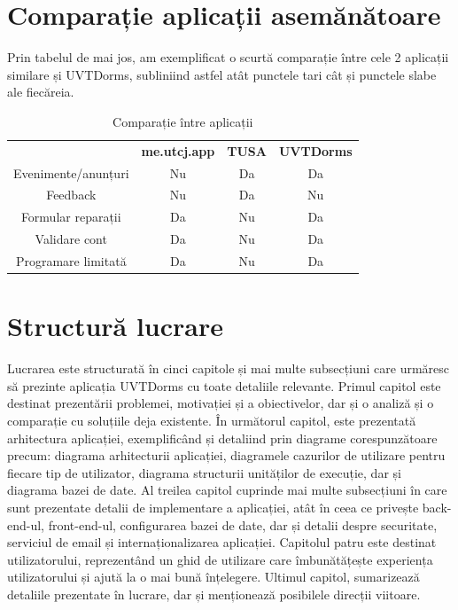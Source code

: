 \documentclass[12pt,a4paper]{report}
\theoremstyle{definition}
\theoremstyle{remark}
\begin{document}
\vspace{15mm}

\section{Comparație aplicații asemănătoare}
\par Prin tabelul de mai jos, am exemplificat o scurtă comparație între cele 2 aplicații similare și UVTDorms, subliniind astfel atât punctele tari cât și punctele slabe ale fiecăreia.

\begin{table}[H]
    \centering
    \begin{tabular}{cccc}
        & \textbf{me.utcj.app}         & \textbf{TUSA}  & \textbf{UVTDorms} \\
        Evenimente/anunțuri                            & Nu               & Da       &Da\\
        Feedback                                       & Nu               & Da       &Nu\\
        Formular reparații                             & Da               & Nu       &Da\\
        Validare cont                                  & Da               & Nu       &Da\\
        Programare limitată                            & Da               & Nu       &Da\\
    \end{tabular}
    \caption{Comparație între aplicații\label{comparatii-intre-aplicatii}}
\end{table}

\section{Structură lucrare}
Lucrarea este structurată în cinci capitole și mai multe subsecțiuni care urmăresc să prezinte aplicația UVTDorms cu toate detaliile relevante. Primul capitol este destinat prezentării problemei, motivației și a obiectivelor, dar și o analiză și o comparație cu soluțiile deja existente. În următorul capitol, este prezentată arhitectura aplicației, exemplificând și detaliind prin diagrame corespunzătoare precum: diagrama arhitecturii aplicației, diagramele cazurilor de utilizare pentru fiecare tip de utilizator, diagrama structurii unităților de execuție, dar și diagrama bazei de date. Al treilea capitol cuprinde mai multe subsecțiuni în care sunt prezentate detalii de implementare a aplicației, atât în ceea ce privește back-end-ul, front-end-ul, configurarea bazei de date, dar și detalii despre securitate, serviciul de email și internaționalizarea aplicației. Capitolul patru este destinat utilizatorului, reprezentând un ghid de utilizare care îmbunătățește experiența utilizatorului și ajută la o mai bună înțelegere. Ultimul capitol, sumarizează detaliile prezentate în lucrare, dar și menționează posibilele direcții viitoare.
\end{document}
